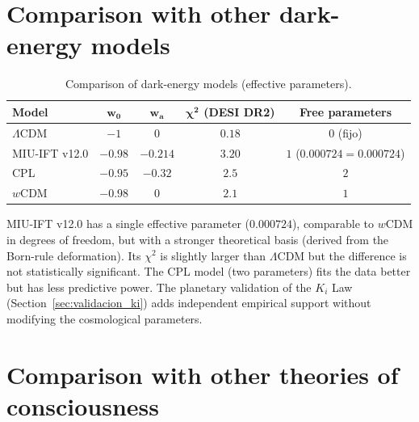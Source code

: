 \documentclass[12pt, a4paper]{article}
\theoremstyle{miuThm}
\theoremstyle{remark}
\newcommand{\eps}{0.000724}
\begin{document}

\clearpage
\section{Comparison with other dark-energy models}

\begin{table}[h!]
\centering
\caption{Comparison of dark-energy models (effective parameters).}
\label{tab:comparacion}
\begin{tabular}{lcccc}
\toprule
\textbf{Model} & $\mathbf{w_0}$ & $\mathbf{w_a}$ & $\mathbf{\chi^2}$ (DESI DR2) & Free parameters \\
\midrule
$\Lambda$CDM & $-1$ & $0$ & $0.18$ & $0$ (fijo) \\
MIU-IFT v12.0 & $-0.98$ & $-0.214$ & $3.20$ & $1$ ($\eps=0.000724$) \\
CPL & $-0.95$ & $-0.32$ & $2.5$ & $2$ \\
$w$CDM & $-0.98$ & $0$ & $2.1$ & $1$ \\
\bottomrule
\end{tabular}
\end{table}

MIU-IFT v12.0 has a single effective parameter ($\eps$), comparable to $w$CDM in degrees of freedom, but with a stronger theoretical basis (derived from the Born-rule deformation). Its $\chi^2$ is slightly larger than $\Lambda$CDM but the difference is not statistically significant. The CPL model (two parameters) fits the data better but has less predictive power. The planetary validation of the $K_i$ Law (Section~\ref{sec:validacion_ki}) adds independent empirical support without modifying the cosmological parameters.

\clearpage
\section{Comparison with other theories of consciousness}
\end{document}
